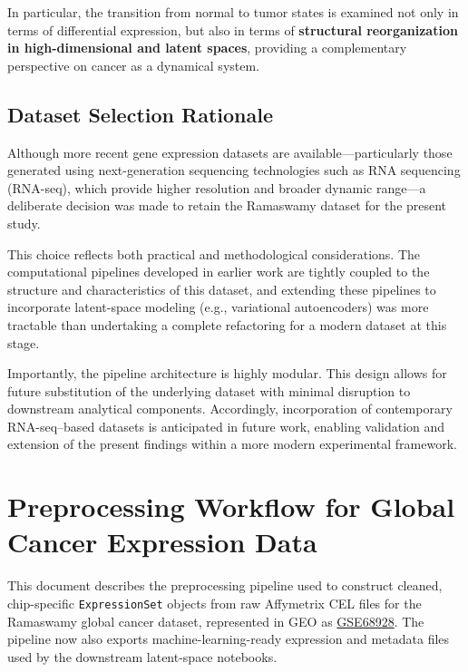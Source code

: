 \documentclass[
  letterpaper,
  DIV=11,
  numbers=noendperiod,
  openany,
  oneside]{scrreprt}
\begin{document}
In particular, the transition from normal to tumor states is examined
not only in terms of differential expression, but also in terms of
\textbf{structural reorganization in high-dimensional and latent
spaces}, providing a complementary perspective on cancer as a dynamical
system.

\section{Dataset Selection Rationale}\label{dataset-selection-rationale}

Although more recent gene expression datasets are
available---particularly those generated using next-generation
sequencing technologies such as RNA sequencing (RNA-seq), which provide
higher resolution and broader dynamic range---a deliberate decision was
made to retain the Ramaswamy dataset for the present study.

This choice reflects both practical and methodological considerations.
The computational pipelines developed in earlier work are tightly
coupled to the structure and characteristics of this dataset, and
extending these pipelines to incorporate latent-space modeling (e.g.,
variational autoencoders) was more tractable than undertaking a complete
refactoring for a modern dataset at this stage.

Importantly, the pipeline architecture is highly modular. This design
allows for future substitution of the underlying dataset with minimal
disruption to downstream analytical components. Accordingly,
incorporation of contemporary RNA-seq--based datasets is anticipated in
future work, enabling validation and extension of the present findings
within a more modern experimental framework.

\chapter{Preprocessing Workflow for Global Cancer Expression
Data}\label{preprocessing-workflow-for-global-cancer-expression-data}

This document describes the preprocessing pipeline used to construct
cleaned, chip-specific \texttt{ExpressionSet} objects from raw
Affymetrix CEL files for the Ramaswamy global cancer dataset,
represented in GEO as
\href{https://www.ncbi.nlm.nih.gov/geo/query/acc.cgi?acc=GSE68928}{GSE68928}.
The pipeline now also exports machine-learning-ready expression and
metadata files used by the downstream latent-space notebooks.
\end{document}
